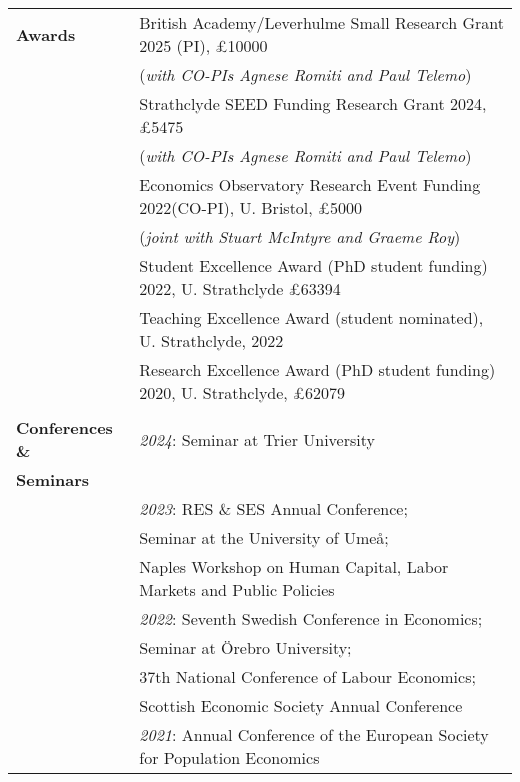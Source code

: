 \documentclass[11pt,a4paper]{article}
\begin{document}
\begin{longtable}{l l}
\newpage		
\textbf{Awards}        										& British Academy/Leverhulme Small Research Grant 2025 (PI), \pounds10000 \\
															& (\emph{with CO-PIs Agnese Romiti and Paul Telemo})  \\                 
\addlinespace
															& Strathclyde SEED Funding Research Grant 2024, \pounds5475 \\
															& (\emph{with CO-PIs Agnese Romiti and Paul Telemo}) \\										
\addlinespace
															&  Economics Observatory Research Event Funding 2022(CO-PI), U. Bristol, \pounds5000   \\
															&  (\emph{joint with Stuart McIntyre and Graeme Roy})   \\
\addlinespace
															& Student Excellence Award (PhD student funding) 2022, U. Strathclyde \pounds63394   \\
\addlinespace
															& Teaching Excellence Award (student nominated), U. Strathclyde, 2022   \\									
\addlinespace
															& Research Excellence Award (PhD student funding)	 2020, U. Strathclyde, \pounds62079   \\
															&  \\							
\textbf{Conferences \&}      				& \textit{2024}: Seminar at Trier University  \\
\textbf{Seminars}							\\		
											& \textit{2023}: RES \& SES Annual Conference;  \\
											& \quad \quad \;\; Seminar at the University of Ume{\aa};  \\
											& \quad \quad \:\: Naples Workshop on Human Capital, Labor Markets and Public Policies \\
\addlinespace
																												&  \textit{2022}: Seventh Swedish Conference in Economics;  \\
																												& \quad \quad \;\; Seminar at \"{O}rebro University;  \\
																												& \quad \quad  \;\; 37th National Conference of Labour Economics;    \\ 
																												&  \quad \quad  \;\; Scottish Economic Society Annual Conference  \\
\addlinespace
																												&  \textit{2021}: Annual Conference of the European Society for Population Economics   \\

\end{longtable}
\end{document}
